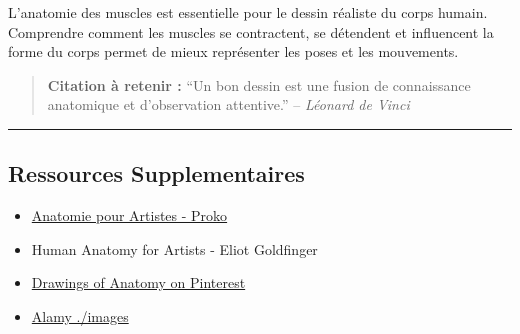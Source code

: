 \documentclass[
]{article}
\providecommand{\tightlist}{%
  \setlength{\itemsep}{0pt}\setlength{\parskip}{0pt}}
\begin{document}
L'anatomie des muscles est essentielle pour le dessin réaliste du corps
humain. Comprendre comment les muscles se contractent, se détendent et
influencent la forme du corps permet de mieux représenter les poses et
les mouvements.

\begin{quote}
\textbf{Citation à retenir :} ``Un bon dessin est une fusion de
connaissance anatomique et d'observation attentive.'' -- \emph{Léonard
de Vinci}
\end{quote}

\begin{center}\rule{0.5\linewidth}{0.5pt}\end{center}

\subsection{Ressources
Supplementaires}\label{ressources-supplementaires}

\begin{itemize}
\tightlist
\item
  \href{https://www.proko.com/}{Anatomie pour Artistes - Proko}
\item
  Human Anatomy for Artists - Eliot Goldfinger
\item
  \href{https://www.pinterest.com/}{Drawings of Anatomy on Pinterest}
\item
  \href{https://www.alamy./images.fr/}{Alamy ./images}
\end{itemize}
\end{document}
